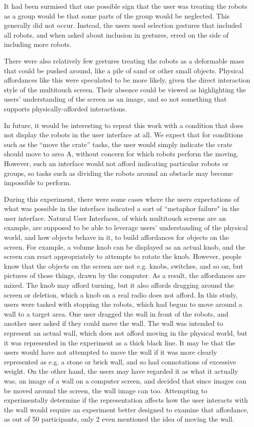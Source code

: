 It had been surmised that one possible sign that the user was treating the robots as a group would be that some parts of the group would be neglected. 
This generally did not occur. 
Instead, the users used selection gestures that included all robots, and when asked about inclusion in gestures, erred on the side of including more robots. 

There were also relatively few gestures treating the robots as a deformable mass that could be pushed around, like a pile of sand or other small objects. 
Physical affordances like this were speculated to be more likely, given the direct interaction style of the multitouch screen. 
Their absence could be viewed as highlighting the users' understanding of the screen as an image, and so not something that supports physically-afforded interactions. 

In future, it would be interesting to repeat this work with a condition that does not display the robots in the user interface at all. 
We expect that for conditions such as the ``move the crate'' tasks, the user would simply indicate the crate should move to area A, without concern for which robots perform the moving. 
However, such an interface would not afford indicating particular robots or groups, so tasks such as dividing the robots around an obstacle may become impossible to perform.

During this experiment, there were some cases where the users expectations of what was possible in the interface indicated a sort of ``metaphor failure" in the user interface. 
Natural User Interfaces, of which multitouch screens are an example, are supposed to be able to leverage users' understanding of the physical world, and how objects behave in it, to build affordances for objects on the screen. 
For example, a volume knob can be displayed as an actual knob, and the screen can react appropriately to attempts to rotate the knob. 
However, people know that the objects on the screen are not e.g. knobs, switches, and so on, but pictures of those things, drawn by the computer. 
As a result, the affordances are mixed. 
The knob may afford turning, but it also affords dragging around the screen or deletion, which a knob on a real radio does not afford. 
In this study, users were tasked with stopping the robots, which had begun to move around a wall to a target area. 
One user dragged the wall in front of the robots, and another user asked if they could move the wall. 
The wall was intended to represent an actual wall, which does not afford moving in the physical world, but it was represented in the experiment as a thick black line. 
It may be that the users would have not attempted to move the wall if it was more clearly represented as e.g. a stone or brick wall, and so had connotations of excessive weight. 
On the other hand, the users may have regarded it as what it actually was, an image of a wall on a computer screen, and decided that since images can be moved around the screen, the wall image can too. 
Attempting to experimentally determine if the representation affects how the user interacts with the wall would require an experiment better designed to examine that affordance, as out of 50 participants, only 2 even mentioned the idea of moving the wall. 

